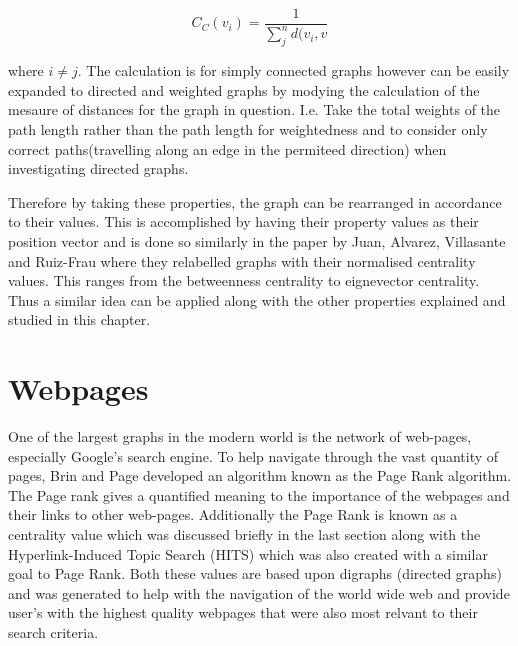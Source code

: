\begin{equation}\label{eq:cce}
C_C(v_i) = \frac{1}{\sum_{j}^nd(v_i, v}
\end{equation}

where $i \ne j$. The calculation is for simply connected graphs however can be easily expanded to directed and weighted graphs by modying the calculation of the mesaure of distances for the graph in question. I.e. Take the total weights of the path length rather than the path length for weightedness and to consider only correct paths(travelling along an edge in the permiteed direction) when investigating directed graphs.

Therefore by taking these properties, the graph can be rearranged in accordance to their values. This is accomplished by having their property values as their position vector and is done so similarly in the paper by Juan, Alvarez, Villasante and Ruiz-Frau\cite{de2021graph} where they relabelled graphs with their normalised centrality values. This ranges from the betweenness centrality to eignevector centrality. Thus a similar idea can be applied along with the other properties explained and studied in this chapter.

\section{Webpages}
One of the largest graphs in the modern world is the network of web-pages, especially Google's search engine. To help navigate through the vast quantity of pages, Brin and Page\cite{brin1998anatomy} developed an algorithm known as the Page Rank algorithm. The Page rank gives a quantified meaning to the importance of the webpages and their links to other web-pages. Additionally the Page Rank is known as a centrality value which was discussed briefly in the last section along with the Hyperlink-Induced Topic Search (HITS) which was also created with a similar goal to Page Rank. Both these values are based upon digraphs (directed graphs) and was generated to help with the navigation of the world wide web and provide user's with the highest quality webpages that were also most relvant to their search criteria.

